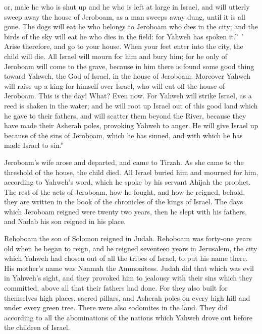 {{or, male} he who is shut up and he who is left at large in Israel, and will utterly sweep away the house of Jeroboam, as a man sweeps away dung, until it is all gone.
The dogs will eat he who belongs to Jeroboam who dies in the city; and the birds of the sky will eat he who dies in the field: for Yahweh has spoken it.” ’
Arise therefore, and go to your house. When your feet enter into the city, the child will die.
All Israel will mourn for him and bury him; for he only of Jeroboam will come to the grave, because in him there is found some good thing toward Yahweh, the God of Israel, in the house of Jeroboam.
Moreover Yahweh will raise up a king for himself over Israel, who will cut off the house of Jeroboam. This is the day! What? Even now.
For Yahweh will strike Israel, as a reed is shaken in the water; and he will root up Israel out of this good land which he gave to their fathers, and will scatter them beyond the River, because they have made their Asherah poles, provoking Yahweh to anger.
He will give Israel up because of the sins of Jeroboam, which he has sinned, and with which he has made Israel to sin.”
\par }{\PP {}Jeroboam’s wife arose and departed, and came to Tirzah. As she came to the threshold of the house, the child died.
All Israel buried him and mourned for him, according to Yahweh’s word, which he spoke by his servant Ahijah the prophet.
The rest of the acts of Jeroboam, how he fought, and how he reigned, behold, they are written in the book of the chronicles of the kings of Israel.
The days which Jeroboam reigned were twenty two years, then he slept with his fathers, and Nadab his son reigned in his place.
\par }{\PP {}Rehoboam the son of Solomon reigned in Judah. Rehoboam was forty-one years old when he began to reign, and he reigned seventeen years in Jerusalem, the city which Yahweh had chosen out of all the tribes of Israel, to put his name there. His mother’s name was Naamah the Ammonitess.
Judah did that which was evil in Yahweh’s sight, and they provoked him to jealousy with their sins which they committed, above all that their fathers had done.
For they also built for themselves high places, sacred pillars, and Asherah poles on every high hill and under every green tree.
There were also sodomites in the land. They did according to all the abominations of the nations which Yahweh drove out before the children of Israel.
}
